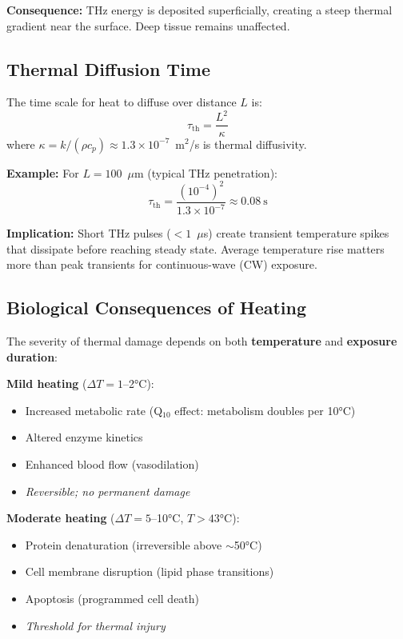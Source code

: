 \textbf{Consequence:} THz energy is deposited superficially, creating a steep thermal gradient near the surface. Deep tissue remains unaffected.

\subsection{Thermal Diffusion Time}

The time scale for heat to diffuse over distance $L$ is:
\begin{equation}
\tau_{\text{th}} = \frac{L^2}{\kappa}
\label{eq:thermal-time}
\end{equation}
where $\kappa = k/(\rho c_p) \approx 1.3 \times 10^{-7}$~m$^2$/s is thermal diffusivity.

\textbf{Example:} For $L = 100$~$\mu$m (typical THz penetration):
\begin{equation}
\tau_{\text{th}} = \frac{(10^{-4})^2}{1.3 \times 10^{-7}} \approx 0.08~\text{s}
\end{equation}

\textbf{Implication:} Short THz pulses ($<1$~$\mu$s) create transient temperature spikes that dissipate before reaching steady state. Average temperature rise matters more than peak transients for continuous-wave (CW) exposure.

\subsection{Biological Consequences of Heating}

The severity of thermal damage depends on both \textbf{temperature} and \textbf{exposure duration}:

\textbf{Mild heating} ($\Delta T = 1$--2°C):
\begin{itemize}
\item Increased metabolic rate (Q$_{10}$ effect: metabolism doubles per 10°C)
\item Altered enzyme kinetics
\item Enhanced blood flow (vasodilation)
\item \textit{Reversible; no permanent damage}
\end{itemize}

\textbf{Moderate heating} ($\Delta T = 5$--10°C, $T > 43°$C):
\begin{itemize}
\item Protein denaturation (irreversible above $\sim$50°C)
\item Cell membrane disruption (lipid phase transitions)
\item Apoptosis (programmed cell death)
\item \textit{Threshold for thermal injury}
\end{itemize}

